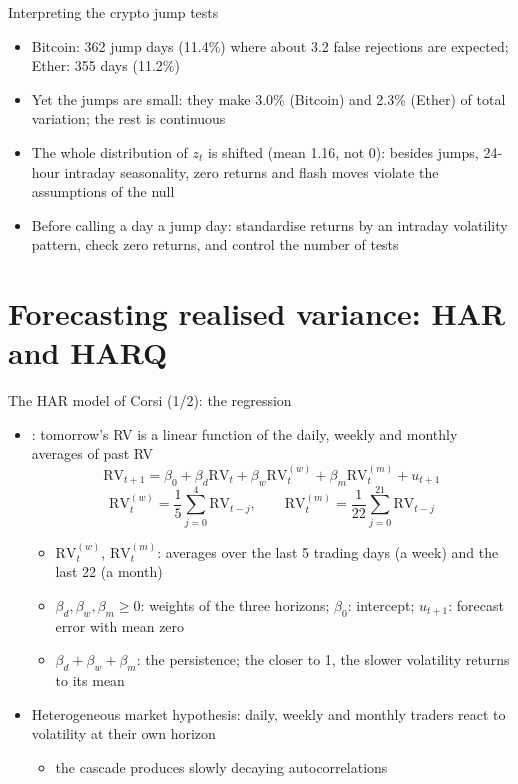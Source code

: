 \begin{frame}{Interpreting the crypto jump tests}
\itemsize{\small}
\begin{itemize}
    \item Bitcoin: 362 jump days (11.4\%) where about 3.2 false rejections are expected; Ether: 355 days (11.2\%)
    \item Yet the jumps are small: they make 3.0\% (Bitcoin) and 2.3\% (Ether) of total variation; the rest is continuous
    \item The whole distribution of $z_t$ is shifted (mean 1.16, not 0): besides jumps, 24-hour intraday seasonality, zero returns and flash moves violate the assumptions of the null
    \item Before calling a day a jump day: standardise returns by an intraday volatility pattern, check zero returns, and control the number of tests
\end{itemize}
\end{frame}


\section{Forecasting realised variance: HAR and HARQ}

\begin{frame}{The HAR model of Corsi (1/2): the regression}
\itemsize{\small}
\begin{itemize}
    \item {}: tomorrow's RV is a linear function of the daily, weekly and monthly averages of past RV
    \[ \mathrm{RV}_{t+1} = \beta_0 + \beta_d\mathrm{RV}_t + \beta_w\mathrm{RV}^{(w)}_t + \beta_m\mathrm{RV}^{(m)}_t + u_{t+1} \]
    \[ \mathrm{RV}^{(w)}_t = \frac15\sum_{j=0}^4\mathrm{RV}_{t-j}, \qquad \mathrm{RV}^{(m)}_t = \frac1{22}\sum_{j=0}^{21}\mathrm{RV}_{t-j} \]
    \begin{itemize}
        \item $\mathrm{RV}^{(w)}_t$, $\mathrm{RV}^{(m)}_t$: averages over the last 5 trading days (a week) and the last 22 (a month)
        \item $\beta_d, \beta_w, \beta_m \ge 0$: weights of the three horizons; $\beta_0$: intercept; $u_{t+1}$: forecast error with mean zero
        \item $\beta_d + \beta_w + \beta_m$: the persistence; the closer to 1, the slower volatility returns to its mean
    \end{itemize}
    \item Heterogeneous market hypothesis: daily, weekly and monthly traders react to volatility at their own horizon
    \begin{itemize}
        \item the cascade produces slowly decaying autocorrelations
    \end{itemize}
\end{itemize}
\end{frame}

